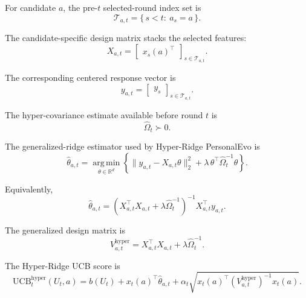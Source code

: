 \documentclass{article} %
\begin{document}
For candidate \(a\), the pre-\(t\) selected-round index set is
\begin{equation}
\label{eq:hyper-index-set}
\mathcal{T}_{a,t}=\{\,s<t:\ a_s=a\,\}.
\end{equation}

The candidate-specific design matrix stacks the selected features:
\begin{equation}
\label{eq:hyper-design-app}
X_{a,t}=
\begin{bmatrix}
x_s(a)^\top
\end{bmatrix}_{s\in\mathcal{T}_{a,t}} .
\end{equation}

The corresponding centered response vector is
\begin{equation}
\label{eq:hyper-response}
y_{a,t}=
\begin{bmatrix}
y_s
\end{bmatrix}_{s\in\mathcal{T}_{a,t}} .
\end{equation}

The hyper-covariance estimate available before round \(t\) is
\begin{equation}
\label{eq:hyper-omega-hat}
\widehat{\Omega}_t \succ 0 .
\end{equation}

The generalized-ridge estimator used by Hyper-Ridge PersonalEvo is
\begin{equation}
\label{eq:hyper-estimator-argmin}
\widehat{\theta}_{a,t}
=
\operatorname*{arg\,min}_{\theta\in\mathbb{R}^d}
\left\{
\|y_{a,t}-X_{a,t}\theta\|_2^2
+
\lambda\,\theta^\top\widehat{\Omega}_t^{-1}\theta
\right\}.
\end{equation}

Equivalently,
\begin{equation}
\label{eq:hyper-estimator-closed}
\widehat{\theta}_{a,t}
=
\left(
X_{a,t}^\top X_{a,t}
+
\lambda \widehat{\Omega}_t^{-1}
\right)^{-1}
X_{a,t}^\top y_{a,t}.
\end{equation}

The generalized design matrix is
\begin{equation}
\label{eq:hyper-vhat}
V_{a,t}^{\mathrm{hyper}}
=
X_{a,t}^\top X_{a,t}
+
\lambda\widehat{\Omega}_t^{-1}.
\end{equation}

The Hyper-Ridge UCB score is
\begin{equation}
\label{eq:hyper-ucb-app}
\mathrm{UCB}_{t}^{\mathrm{hyper}}(U_t,a)
=
b(U_t)+x_t(a)^\top \widehat{\theta}_{a,t}
+
\alpha_t
\sqrt{
x_t(a)^\top
\left(V_{a,t}^{\mathrm{hyper}}\right)^{-1}
x_t(a)
}.
\end{equation}
\end{document}
